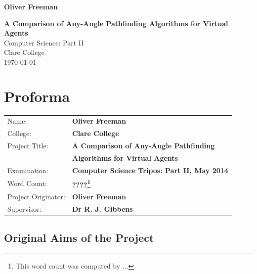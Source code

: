 \documentclass[12pt,twoside,notitlepage]{report}
\begin{document}


\pagestyle{empty}

\hfill{\LARGE \bf Oliver Freeman}

\vspace*{60mm}
\begin{center}
\Huge
{\bf A Comparison of Any-Angle Pathfinding Algorithms for Virtual Agents} \\
\vspace*{5mm}
Computer Science: Part II \\
\vspace*{5mm}
Clare College \\
\vspace*{5mm}
\today  %
\end{center}

\cleardoublepage


\setcounter{page}{1}
\pagestyle{plain}

\chapter*{Proforma}

{\large
\begin{tabular}{ll}
Name:               & \bf Oliver Freeman                      \\
College:            & \bf Clare College                    \\
Project Title:      & \bf A Comparison of Any-Angle Pathfinding\\ 
                    & \bf Algorithms for Virtual Agents \\
Examination:        & \bf Computer Science Tripos: Part II, May 2014        \\
Word Count:         & \bf ????\footnote{This word count was computed by ...}  \\
Project Originator: & \bf Oliver Freeman                   \\
Supervisor:         & \bf Dr R. J. Gibbens                   \\ 
\end{tabular}
}


\section*{Original Aims of the Project}
\end{document}
